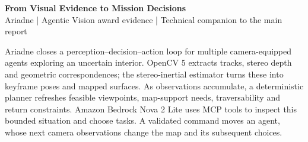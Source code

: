 \documentclass[11pt,a4paper]{article}
\newcommand{\subhead}[1]{\Needspace{5\baselineskip}\vspace{0.5em}\noindent{\bfseries #1}\par\vspace{-0.1em}}
\begin{document}
\begin{center}
{\Large\bfseries From Visual Evidence to Mission Decisions}\\[3pt]
{\small Ariadne | Agentic Vision award evidence | Technical companion to the main report}
\end{center}
\vspace{-0.6em}

\subhead{An agent acts on a changing map}
Ariadne closes a perception--decision--action loop for multiple camera-equipped agents exploring an uncertain interior. OpenCV 5 extracts tracks, stereo depth and geometric correspondences; the stereo-inertial estimator turns these into keyframe poses and mapped surfaces. As observations accumulate, a deterministic planner refreshes feasible viewpoints, map-support needs, traversability and return constraints. Amazon Bedrock Nova 2 Lite uses MCP tools to inspect this bounded situation and choose tasks. A validated command moves an agent, whose next camera observations change the map and its subsequent choices.

\begin{center}
\end{center}
\end{document}
